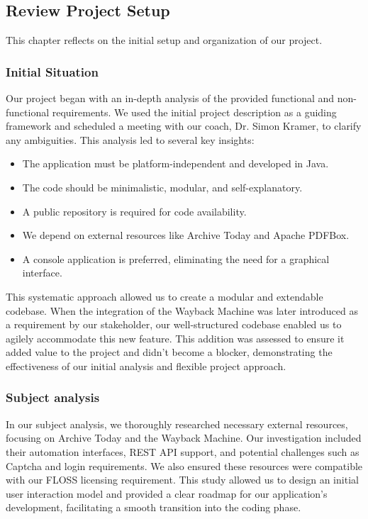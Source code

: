 \subsection{Review Project Setup}
This chapter reflects on the initial setup and organization of our project.

\subsubsection{Initial Situation}
Our project began with an in-depth analysis of the provided functional and non-functional requirements.
We used the initial project description as a guiding framework and scheduled a meeting with our coach, Dr. Simon Kramer, to clarify any ambiguities.
This analysis led to several key insights:
\begin{itemize}
    \item The application must be platform-independent and developed in Java.
    \item The code should be minimalistic, modular, and self-explanatory.
    \item A public repository is required for code availability.
    \item We depend on external resources like Archive Today and Apache PDFBox.
    \item A console application is preferred, eliminating the need for a graphical interface.
\end{itemize}

This systematic approach allowed us to create a modular and extendable codebase.
When the integration of the Wayback Machine was later introduced as a requirement by our stakeholder, our well-structured codebase enabled us to agilely accommodate this new feature.
This addition was assessed to ensure it added value to the project and didn't become a blocker, demonstrating the effectiveness of our initial analysis and flexible project approach.

\subsubsection{Subject analysis}
In our subject analysis, we thoroughly researched necessary external resources, focusing on Archive Today and the Wayback Machine.
Our investigation included their automation interfaces, REST API support, and potential challenges such as Captcha and login requirements.
We also ensured these resources were compatible with our FLOSS licensing requirement.
This study allowed us to design an initial user interaction model and provided a clear roadmap for our application's development, facilitating a smooth transition into the coding phase.

